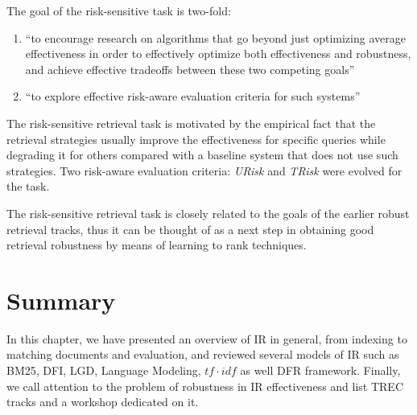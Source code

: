 The goal of the risk-sensitive task is two-fold:

\begin{enumerate}
\item ``to encourage research on algorithms that go beyond just optimizing average effectiveness in order to effectively optimize both effectiveness and robustness, and achieve effective tradeoffs between these two competing goals''
\item ``to explore effective risk-aware evaluation criteria for such systems''
\end{enumerate}

The risk-sensitive retrieval task is motivated by the empirical fact that the retrieval strategies usually improve the effectiveness for specific queries while degrading it for others compared with a baseline system that does not use such strategies.
Two risk-aware evaluation criteria: \emph{URisk} \citep{URisk} and \emph{TRisk} \citep{TRisk} were evolved for the task.

The risk-sensitive retrieval task is closely related to the goals of the earlier robust retrieval tracks, thus it can be thought of as a next step in obtaining good retrieval robustness by means of learning to rank techniques.

\section{Summary}

In this chapter, we have presented an overview of IR in general, from indexing to matching documents and evaluation, and reviewed several models of IR such as BM25, DFI, LGD, Language Modeling, $tf\cdot idf$ as well DFR framework.
Finally, we call attention to the problem of robustness in IR effectiveness and list TREC tracks and a workshop dedicated on it.




 


